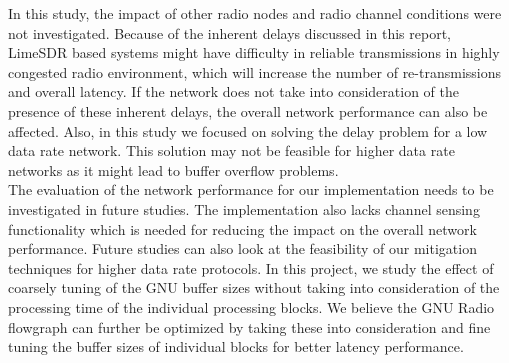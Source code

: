 In this study, the impact of other radio nodes and radio channel conditions were not investigated. Because of the inherent delays discussed in this report, LimeSDR based systems might have difficulty in reliable transmissions in highly congested radio environment, which will increase the number of re-transmissions and overall latency. If the network does not take into consideration of the presence of these inherent delays, the overall network performance can also be affected. Also, in this study we focused on solving the delay problem for a low data rate network. This solution may not be feasible for higher data rate networks as it might lead to buffer overflow problems.\\

The evaluation of the network performance for our implementation needs to be investigated in future studies.
The implementation also lacks channel sensing functionality which is needed for reducing the impact on the overall network performance.
Future studies can also look at the feasibility of our mitigation techniques for higher data rate protocols.
In this project, we study the effect of coarsely tuning of the GNU buffer sizes without taking into consideration of the processing time of the individual processing blocks.
We believe the GNU Radio flowgraph can further be optimized by taking these into consideration and fine tuning the buffer sizes of individual blocks for better latency performance.

